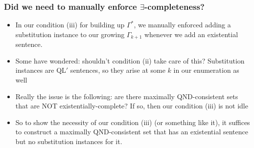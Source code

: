 \begin{frame}
\begin{itemize}[<+->]
\iffalse 

\item Given a QL$'$-model $\mathfrak{M}'=(D, I')$ that satisfies $\Gamma'$, we construct a QL-model $\mathfrak{M}= (D, I)$ with the same domain as follows: 
\item[] for each subscripted QL-constant $\script{c}_i$, $I(\script{c}_i) :=I'(\script{c}'_i)$, and for the non-subscripted constants $I$ and $I'$ agree.
\item[] For each $k$-place predicate $P$, $I(P) := I'(P)$ 

\item Note that $I$ is well-defined because by construction the unprimed and primed constants stand in one-to-one correspondence, \\ and $\Gamma$ and $\Gamma'$ have exactly the same predicates %



\item Claim: Then the QL-model $\mathfrak{M}$ satisfies $\Gamma$ 

\fi 

\end{itemize}
\end{frame}

\begin{frame}
\frametitle{Did we need to manually enforce $\exists $-completeness?}

\begin{itemize}[<+->]

\item In our condition (iii) for building up $\Gamma^{\ast}$, we manually enforced adding a substitution instance to our growing $\Gamma_{k+1}$ whenever we add an existential sentence. 

\item Some have wondered: shouldn't condition (ii) take care of this? Substitution instances are QL$'$ sentences, so they arise at some $k$ in our enumeration as well

\item Really the issue is the following: are there maximally QND-consistent sets that are NOT existentially-complete? If so, then our condition (iii) is not idle

\item So to show the necessity of our condition (iii) (or something like it), it suffices to construct a maximally QND-consistent set that has an existential sentence but no substitution instances for it. 


\end{itemize}
\end{frame}


